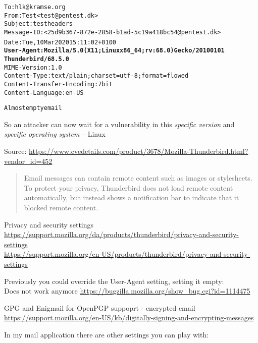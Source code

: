 \documentclass[Screen16to9,17pt]{foils}
\begin{document}
\begin{alltt}\footnotesize
To: hlk@kramse.org
From: Test <test@pentest.dk>
Subject: test headers
Message-ID: <25d9b367-872e-2858-b1ad-5c19a418bc54@pentest.dk>
Date: Tue, 10 Mar 2020 15:11:02 +0100{\bf
User-Agent: Mozilla/5.0 (X11; Linux x86_64; rv:68.0) Gecko/20100101
 Thunderbird/68.5.0}
MIME-Version: 1.0
Content-Type: text/plain; charset=utf-8; format=flowed
Content-Transfer-Encoding: 7bit
Content-Language: en-US

Almost empty email
\end{alltt}

So an attacker can now wait for a vulnerability in this \emph{specific version} and  \emph{specific operating system} -- Linux


Source: {\footnotesize\url{https://www.cvedetails.com/product/3678/Mozilla-Thunderbird.html?vendor_id=452}}



\begin{quote}
Email messages can contain remote content such as images or stylesheets. To protect your privacy, Thunderbird does not load remote content automatically, but instead shows a notification bar to indicate that it blocked remote content.
\end{quote}

\begin{list2}
\item Privacy and security settings\\{\footnotesize \url{https://support.mozilla.org/da/products/thunderbird/privacy-and-security-settings}\\
\url{https://support.mozilla.org/en-US/products/thunderbird/privacy-and-security-settings}}
\item Previously you could override the User-Agent setting, setting it empty:\\
Does not work anymore
\url{https://bugzilla.mozilla.org/show_bug.cgi?id=1114475}
\item GPG and Enigmail for OpenPGP suppoprt - encrypted email\\
\url{https://support.mozilla.org/en-US/kb/digitally-signing-and-encrypting-messages}
\end{list2}


In my mail application there are other settings you can play with:
\end{document}
